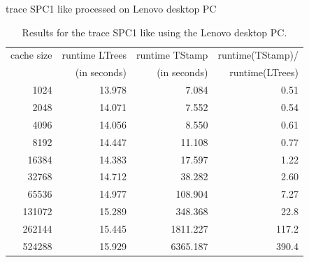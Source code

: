 \documentclass[a4paper,12pt, titlepage]{article}  %
\begin{document}
\begin{table}[p]
\begin{center}
	trace SPC1 like processed on Lenovo desktop PC
	\begin{tabular}{|r||r|r|r|}
	  	\hline
                cache size                               &     runtime LTrees         &      runtime TStamp          &  runtime(TStamp)/ \\
                                                             &      (in seconds)            &      (in seconds)                 & runtime(LTrees)     \\
                \hline
                1024			             &          13.978                    &              7.084                      &     0.51                   \\
		2048					     &       14.071                       &      7.552                              &     0.54                   \\								
		4096					     &       14.056                       &      8.550                              &        0.61               \\	
		8192					     &       14.447                       &      11.108                              &     0.77                   \\	
		16384				     &       14.383                       &      17.597                              &     1.22                   \\	
		32768				     &       14.712                       &      38.282                              &     2.60                   \\	
		65536				     &       14.977                       &     108.904                               &    7.27                    \\	
		131072				     &       15.289                      &      348.368                              &     22.8                   \\	
		262144				     &       15.445                       &     1811.227                               &   117.2                     \\	
		524288				     &       15.929                       &     6365.187                               &   390.4                     \\
                \hline
	\end{tabular}
	\caption{Results for the trace SPC1 like using the Lenovo desktop PC.}
        \label{tab:lenovo_SPC1}
\end{center}
\end{table}
\end{document}
